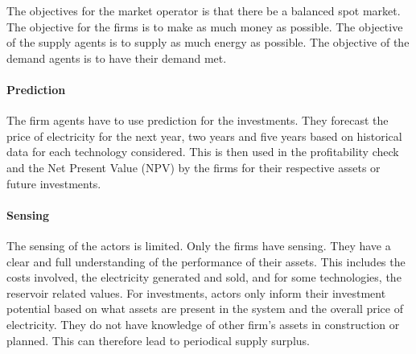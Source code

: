 The objectives for the market operator is that there be a balanced spot market. The objective for the firms is to make as much money as possible. The objective of the supply agents is to supply as much energy as possible. The objective of the demand agents is to have their demand met. 

\paragraph{Prediction}

The firm agents have to use prediction for the investments. They forecast the price of electricity for the next year, two years and five years based on historical data for each technology considered. This is then used in the profitability check and the Net Present Value (NPV) by the firms for their respective assets or future investments.

\paragraph{Sensing}

The sensing of the actors is limited. Only the firms have sensing. They have a clear and full understanding of the performance of their assets. This includes the costs involved, the electricity generated and sold, and for some technologies, the reservoir related values. For investments, actors only inform their investment potential based on what assets are present in the system and the overall price of electricity. They do not have knowledge of other firm's assets in construction or planned. This can therefore lead to periodical supply surplus.

